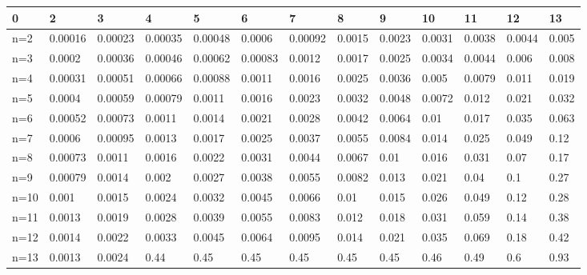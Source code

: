 \begin{tabular}{l|llllllllllll}
\toprule 
0 & 2 & 3 & 4 & 5 & 6 & 7 & 8 & 9 & 10 & 11 & 12 & 13 \\
\hline 
n=2 & 0.00016 & 0.00023 & 0.00035 & 0.00048 & 0.0006 & 0.00092 & 0.0015 & 0.0023 & 0.0031 & 0.0038 & 0.0044 & 0.005 \\
n=3 & 0.0002 & 0.00036 & 0.00046 & 0.00062 & 0.00083 & 0.0012 & 0.0017 & 0.0025 & 0.0034 & 0.0044 & 0.006 & 0.008 \\
n=4 & 0.00031 & 0.00051 & 0.00066 & 0.00088 & 0.0011 & 0.0016 & 0.0025 & 0.0036 & 0.005 & 0.0079 & 0.011 & 0.019 \\
n=5 & 0.0004 & 0.00059 & 0.00079 & 0.0011 & 0.0016 & 0.0023 & 0.0032 & 0.0048 & 0.0072 & 0.012 & 0.021 & 0.032 \\
n=6 & 0.00052 & 0.00073 & 0.0011 & 0.0014 & 0.0021 & 0.0028 & 0.0042 & 0.0064 & 0.01 & 0.017 & 0.035 & 0.063 \\
n=7 & 0.0006 & 0.00095 & 0.0013 & 0.0017 & 0.0025 & 0.0037 & 0.0055 & 0.0084 & 0.014 & 0.025 & 0.049 & 0.12 \\
n=8 & 0.00073 & 0.0011 & 0.0016 & 0.0022 & 0.0031 & 0.0044 & 0.0067 & 0.01 & 0.016 & 0.031 & 0.07 & 0.17 \\
n=9 & 0.00079 & 0.0014 & 0.002 & 0.0027 & 0.0038 & 0.0055 & 0.0082 & 0.013 & 0.021 & 0.04 & 0.1 & 0.27 \\
n=10 & 0.001 & 0.0015 & 0.0024 & 0.0032 & 0.0045 & 0.0066 & 0.01 & 0.015 & 0.026 & 0.049 & 0.12 & 0.28 \\
n=11 & 0.0013 & 0.0019 & 0.0028 & 0.0039 & 0.0055 & 0.0083 & 0.012 & 0.018 & 0.031 & 0.059 & 0.14 & 0.38 \\
n=12 & 0.0014 & 0.0022 & 0.0033 & 0.0045 & 0.0064 & 0.0095 & 0.014 & 0.021 & 0.035 & 0.069 & 0.18 & 0.42 \\
n=13 & 0.0013 & 0.0024 & 0.44 & 0.45 & 0.45 & 0.45 & 0.45 & 0.45 & 0.46 & 0.49 & 0.6 & 0.93 \\
\bottomrule 
\end{tabular}
